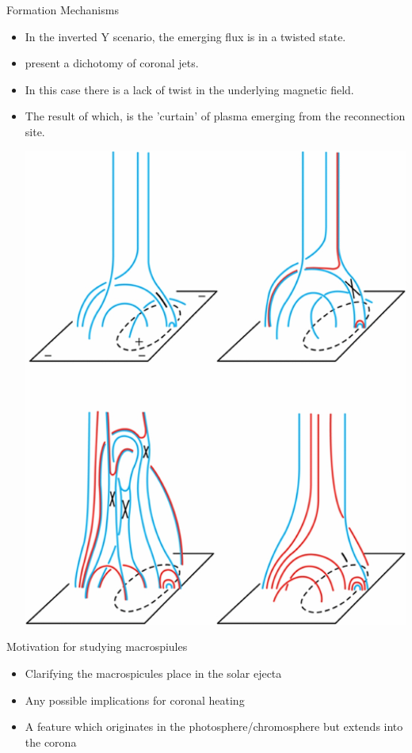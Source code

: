 \documentclass{beamer}
\begin{document}
	\begin{frame}{Formation Mechanisms}
		\begin{itemize}
			\item{In the inverted Y scenario, the emerging flux is in a twisted state.}
			\item{\cite{Moore2010} present a dichotomy of coronal jets.}
			\item{In this case there is a lack of twist in the underlying magnetic field.}
			\item{The result of which, is the 'curtain' of plasma emerging from the reconnection site.}
			
			\includegraphics[scale=0.2]{"Figs/blowout_jet.jpg"}
			\caption{\cite{Moore2010}}
		\end{itemize}
		
		
	\end{frame}
	
	
	\begin{frame}{Motivation for studying macrospiules}
		\begin{itemize}
			\item{Clarifying the macrospicules place in the solar ejecta}
			\item{Any possible implications for coronal heating}
			\item{A feature which originates in the photosphere/chromosphere but extends into the corona}
		\end{itemize}
	\end{frame}		
\end{document}
